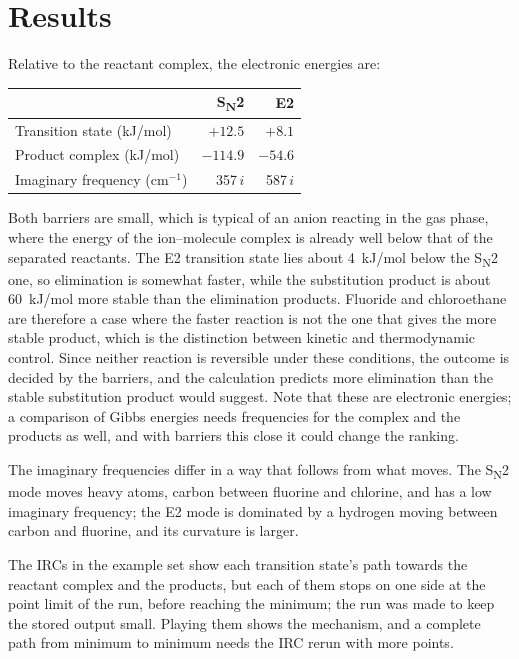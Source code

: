 \section{Results}
Relative to the reactant complex, the electronic energies are:
\begin{center}
\begin{tabular}{lrr}
	\toprule
	 & S\textsubscript{N}2 & E2 \\
	\midrule
	Transition state (kJ/mol) & $+12.5$ & $+8.1$ \\
	Product complex (kJ/mol) & $-114.9$ & $-54.6$ \\
	Imaginary frequency (cm$^{-1}$) & 357\,$i$ & 587\,$i$ \\
	\bottomrule
\end{tabular}
\end{center}
Both barriers are small, which is typical of an anion reacting in the gas phase, where the energy of the ion--molecule complex is already well below that of the separated reactants. The E2 transition state lies about 4~kJ/mol below the S\textsubscript{N}2 one, so elimination is somewhat faster, while the substitution product is about 60~kJ/mol more stable than the elimination products. Fluoride and chloroethane are therefore a case where the faster reaction is not the one that gives the more stable product, which is the distinction between kinetic and thermodynamic control. Since neither reaction is reversible under these conditions, the outcome is decided by the barriers, and the calculation predicts more elimination than the stable substitution product would suggest. Note that these are electronic energies; a comparison of Gibbs energies needs frequencies for the complex and the products as well, and with barriers this close it could change the ranking.

The imaginary frequencies differ in a way that follows from what moves. The S\textsubscript{N}2 mode moves heavy atoms, carbon between fluorine and chlorine, and has a low imaginary frequency; the E2 mode is dominated by a hydrogen moving between carbon and fluorine, and its curvature is larger.

The IRCs in the example set show each transition state's path towards the reactant complex and the products, but each of them stops on one side at the point limit of the run, before reaching the minimum; the run was made to keep the stored output small. Playing them shows the mechanism, and a complete path from minimum to minimum needs the IRC rerun with more points.

